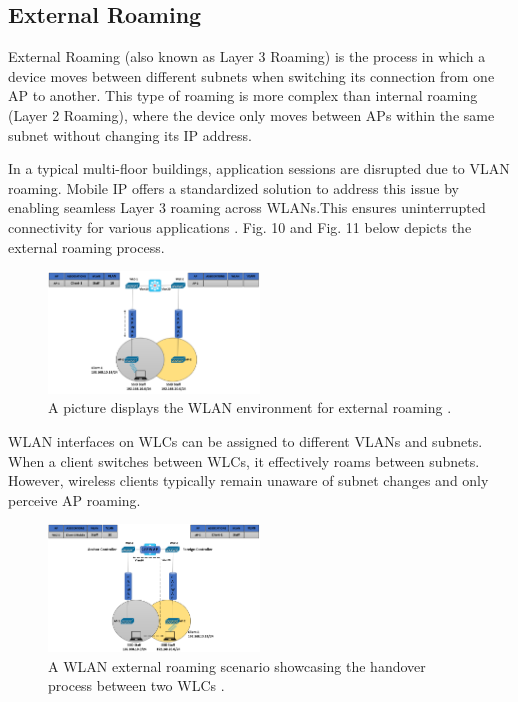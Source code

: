 \documentclass[conference]{IEEEtran}
\begin{document}
\subsection{External Roaming}

External Roaming (also known as Layer 3 Roaming) is the process in which a device moves between different subnets when switching its connection from one AP to another. This type of roaming is more complex than internal roaming (Layer 2 Roaming), where the device only moves between APs within the same subnet without changing its IP address.

In a typical multi-floor buildings, application sessions are disrupted due to VLAN roaming. Mobile IP offers a standardized solution to address this issue by enabling seamless Layer 3 roaming across WLANs.This ensures uninterrupted connectivity for various applications \cite{wlan_fundamentals}. Fig. 10 and Fig. 11 below depicts the external roaming process.

\begin{figure}[htbp]
    \centering
    \includegraphics[width=0.5\textwidth]{fig10_external_roaming.png}
    \caption{A picture displays the WLAN environment for external roaming \cite{study_ccnp}.}
\end{figure}

WLAN interfaces on WLCs can be assigned to different VLANs and subnets. When a client switches between WLCs, it effectively roams between subnets. However, wireless clients typically remain unaware of subnet changes and only perceive AP roaming.

\begin{figure}[htbp]
    \centering
    \includegraphics[width=0.5\textwidth]{fig11_external_roaming_after_roaming.png}
    \caption{A WLAN external roaming scenario showcasing the handover process between two WLCs \cite{study_ccnp}.}
\end{figure}
\end{document}
